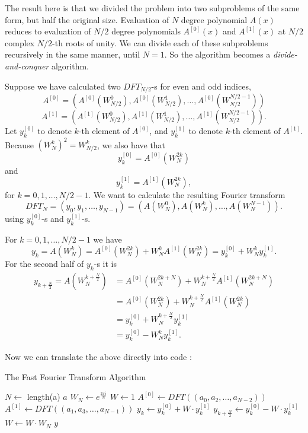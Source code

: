 \documentclass[10pt]{article}
\begin{document}
The result here is that we divided the problem into two subproblems of the same
form, but half the original size. Evaluation of $N$ degree polynomial $A(x)$
reduces to evaluation of $N/2$ degree polynomials $A^{[0]}(x)$ and $A^{[1]}(x)$
at $N/2$ complex $N/2$-th roots of unity. We can divide each of these
subproblems recursively in the same manner, until $N=1$. So the algorithm
becomes a {\it divide-and-conquer} algorithm.

Suppose we have calculated two $DFT_{N/2}$-s for even and odd indices,
$$A^{[0]} = \left(A^{[0]}(W_{N/2}^0), A^{[0]}(W_{N/2}^1), \ldots, A^{[0]}(W_{N/2}^{N/2-1})\right)$$
$$A^{[1]} = \left(A^{[1]}(W_{N/2}^0), A^{[1]}(W_{N/2}^1), \ldots, A^{[1]}(W_{N/2}^{N/2-1})\right).$$
Let $y^{[0]}_k$ to denote $k$-th element of $A^{[0]}$, and $y^{[1]}_k$ to
denote $k$-th element of $A^{[1]}$. Because $(W_N^k)^2=W_{N/2}^k$, we also have
that $$y^{[0]}_k = A^{[0]}(W_N^{2k})$$
and
$$y^{[1]}_k = A^{[1]}(W_N^{2k}),$$
for $k = 0, 1, \ldots, N/2-1$.
We want to calculate the resulting Fourier transform
$$DFT_N=(y_0, y_1, \ldots, y_{N-1})=\left(A(W_N^0), A(W_N^k), \ldots, A(W_N^{N-1}) \right).$$
using $y^{[0]}_k$-s and $y^{[1]}_k$-s.

For $k=0, 1, \ldots, N/2-1$ we have
$$y_k = A(W_N^k)=A^{[0]}(W_N^{2k}) + W_N^kA^{[1]}(W_N^{2k}) = y_k^{[0]} + W_N^ky_k^{[1]}.$$
For the second half of $y_k$-s it is
\begin{align*}
y_{k+\frac{N}{2}} = A(W_N^{k+\frac{N}{2}})
                 &= A^{[0]}(W_N^{2k+N}) + W_N^{k+\frac{N}{2}}A^{[1]}(W_N^{2k + N})\\
                 &= A^{[0]}(W_N^{2k}) + W_N^{k+\frac{N}{2}}A^{[1]}(W_N^{2k})\\
                 &= y^{[0]}_k + W_N^{k+\frac{N}{2}}y^{[1]}_k \\
                 &= y^{[0]}_k - W_N^{k}y^{[1]}_k.
\end{align*}

Now we can translate the above directly into code \cite{Cormen2009}:

\begin{algorithm}[h]
\caption*{The Fast Fourier Transform Algorithm}
\begin{algorithmic}
  \State $N \gets $ length(a)
   \State \Return $a$ \EndIf
  \State $W_N \gets e^{\frac{2\pi i}{N}}$
  \State $W \gets 1$
  \State $A^{[0]} \gets DFT\left( \left(a_0, a_2, \ldots, a_{N-2} \right) \right)$
  \State $A^{[1]} \gets DFT\left( \left(a_1, a_3, \ldots, a_{N-1} \right) \right)$
     \State $y_k \gets y_k^{[0]} + W \cdot y_k^{[1]}$
     \State $y_{k+\frac{N}{2}} \gets y_k^{[0]} - W \cdot y_k^{[1]}$
     \State $W \gets W \cdot W_N$
  \EndFor
  \State \Return $y$ 
\EndFunction
\end{algorithmic}
\end{algorithm}
\end{document}
